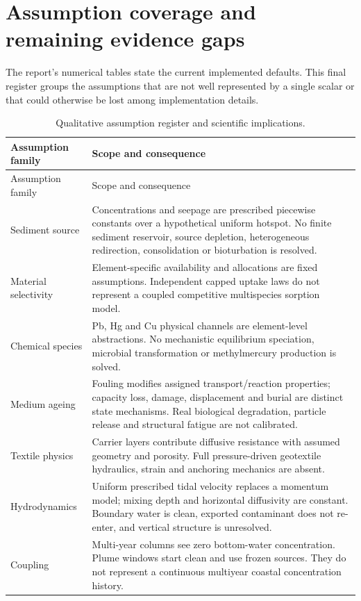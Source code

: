 \section{Assumption coverage and remaining evidence gaps}
\label{app:assumptions}
The report's numerical tables state the current implemented defaults. This final register groups the assumptions that are not well represented by a single scalar or that could otherwise be lost among implementation details.
\begin{longtable}{p{.24\linewidth}p{.64\linewidth}}
\caption{Qualitative assumption register and scientific implications.}\label{tab:assumption-register}\\
\toprule Assumption family & Scope and consequence\\\midrule\endfirsthead
\toprule Assumption family & Scope and consequence\\\midrule\endhead
Sediment source & Concentrations and seepage are prescribed piecewise constants over a hypothetical uniform hotspot. No finite sediment reservoir, source depletion, heterogeneous redirection, consolidation or bioturbation is resolved.\\
Material selectivity & Element-specific availability and allocations are fixed assumptions. Independent capped uptake laws do not represent a coupled competitive multispecies sorption model.\\
Chemical species & Pb, Hg and Cu physical channels are element-level abstractions. No mechanistic equilibrium speciation, microbial transformation or methylmercury production is solved.\\
Medium ageing & Fouling modifies assigned transport/reaction properties; capacity loss, damage, displacement and burial are distinct state mechanisms. Real biological degradation, particle release and structural fatigue are not calibrated.\\
Textile physics & Carrier layers contribute diffusive resistance with assumed geometry and porosity. Full pressure-driven geotextile hydraulics, strain and anchoring mechanics are absent.\\
Hydrodynamics & Uniform prescribed tidal velocity replaces a momentum model; mixing depth and horizontal diffusivity are constant. Boundary water is clean, exported contaminant does not re-enter, and vertical structure is unresolved.\\
Coupling & Multi-year columns see zero bottom-water concentration. Plume windows start clean and use frozen sources. They do not represent a continuous multiyear coastal concentration history.\\

\end{longtable}
